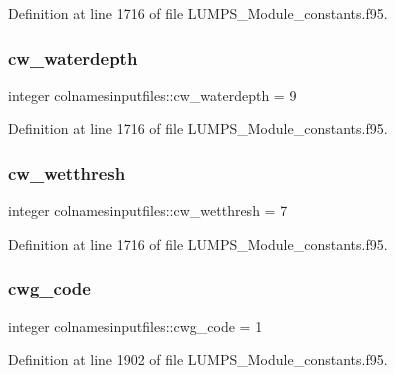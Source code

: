 Definition at line 1716 of file L\+U\+M\+P\+S\+\_\+\+Module\+\_\+constants.\+f95.

\mbox{\label{namespacecolnamesinputfiles_add367c34c8e4c7d6b2e3e6a1cea6d4cb}} 
\subsubsection{\texorpdfstring{cw\+\_\+waterdepth}{cw\_waterdepth}}
{\footnotesize\ttfamily integer colnamesinputfiles\+::cw\+\_\+waterdepth = 9}



Definition at line 1716 of file L\+U\+M\+P\+S\+\_\+\+Module\+\_\+constants.\+f95.

\mbox{\label{namespacecolnamesinputfiles_ae8900c6d6e9eb550cf1c702acb65dc20}} 
\subsubsection{\texorpdfstring{cw\+\_\+wetthresh}{cw\_wetthresh}}
{\footnotesize\ttfamily integer colnamesinputfiles\+::cw\+\_\+wetthresh = 7}



Definition at line 1716 of file L\+U\+M\+P\+S\+\_\+\+Module\+\_\+constants.\+f95.

\mbox{\label{namespacecolnamesinputfiles_a64bfff0bf57d14dd835e873f6f3167d8}} 
\subsubsection{\texorpdfstring{cwg\+\_\+code}{cwg\_code}}
{\footnotesize\ttfamily integer colnamesinputfiles\+::cwg\+\_\+code = 1}



Definition at line 1902 of file L\+U\+M\+P\+S\+\_\+\+Module\+\_\+constants.\+f95.

